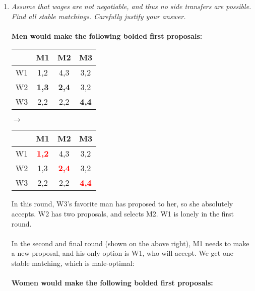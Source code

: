 \documentclass[]{article}
\begin{document}
\begin{enumerate}[label = (\alph*)]

\item \emph{Assume that wages are not negotiable, and thus no side transfers are possible. Find all stable matchings. Carefully justify your answer.} \\
\\

\textbf{Men would make the following bolded first proposals:}
\begin{center}
\begin{tabular}{|c|c|c|c|}
\hline 
  & M1 & M2 & M3 \\ 
\hline 
W1 & 1,2 & 4,3 & 3,2 \\ 
\hline 
W2 & \textbf{1,3} & \textbf{2,4} & 3,2 \\ 
\hline 
W3 & 2,2 & 2,2 & \textbf{4,4} \\ 
\hline 
\end{tabular} 
$\longrightarrow$
\begin{tabular}{|c|c|c|c|}
\hline 
  & M1 & M2 & M3 \\ 
\hline 
W1 & \textbf{\textcolor{red}{1,2}} & 4,3 & 3,2 \\ 
\hline 
W2 & 1,3 & \textbf{\textcolor{red}{2,4}} & 3,2 \\ 
\hline 
W3 & 2,2 & 2,2 & \textbf{\textcolor{red}{4,4}} \\ 
\hline 
\end{tabular} 
\end{center}

In this round, W3's favorite man has proposed to her, so she absolutely accepts. W2 has two proposals, and selects M2. W1 is lonely in the first round. \\
\\
In the second and final round (shown on the above right), M1 needs to make a new proposal, and his only option is W1, who will accept. We get one stable matching, which is male-optimal: \\
\\

\textbf{Women would make the following bolded first proposals:}


\end{enumerate}
\end{document}
